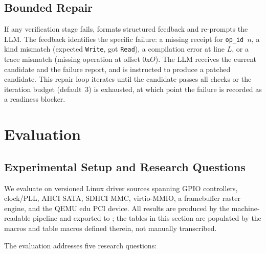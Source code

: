 \subsection{Bounded Repair}

If any verification stage fails, \reharness{} formats structured feedback and
re-prompts the LLM. The feedback identifies the specific failure: a missing
receipt for \texttt{op\_id\,$n$}, a kind mismatch (expected \texttt{Write},
got \texttt{Read}), a compilation error at line $L$, or a trace mismatch
(missing operation at offset 0x$O$). The LLM receives the current candidate
and the failure report, and is instructed to produce a patched candidate.
This repair loop iterates until the candidate passes all checks or the
iteration budget (default~3) is exhausted, at which point the failure is
recorded as a readiness blocker.

\section{Evaluation}
\label{sec:evaluation}

\subsection{Experimental Setup and Research Questions}

We evaluate \reharness{} on \EvalDrivers{} versioned Linux driver sources
spanning GPIO controllers, clock/PLL, AHCI SATA, SDHCI MMC, virtio-MMIO, a
framebuffer raster engine, and the QEMU edu PCI device. All results are
produced by the machine-readable  pipeline and exported to
; the
tables in this section are populated by the macros and table macros defined
therein, not manually transcribed.

The evaluation addresses five research questions:

